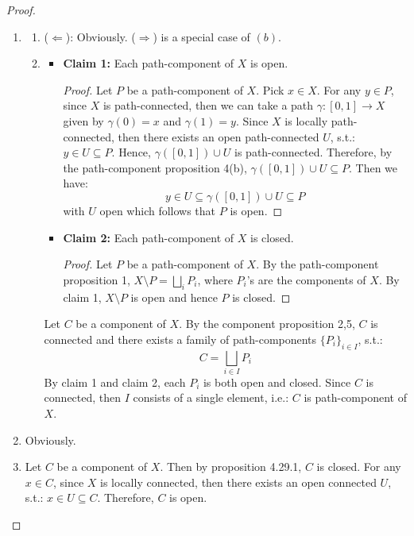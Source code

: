 \begin{proof}
    \begin{enumerate}
        \item \begin{enumerate}
            \item ($\Leftarrow$): Obviously. ($\Rightarrow$) is a special case of $(b)$.
            \item \begin{itemize}
                \item \textbf{Claim 1:} Each path-component of $X$ is open.
                \begin{proof}
                    Let $P$ be a path-component of $X$. Pick $x \in X$. For any $y \in P$, since $X$ is path-connected, then we can take a path $\gamma : [0,1] \to X$ given by $\gamma (0) = x$ and $\gamma (1) =y$. Since $X$ is locally path-connected, then there exists an open path-connected $U$, s.t.: $y \in U \subseteq P$. Hence, $\gamma ([0,1]) \cup U$ is path-connected. Therefore, by the path-component proposition 4(b), $\gamma ([0,1]) \cup U \subseteq P$. Then we have:
                    $$y \in U \subseteq \gamma ([0,1]) \cup U \subseteq P$$
                    with $U$ open which follows that $P$ is open.
                \end{proof}
                \item \textbf{Claim 2:} Each path-component of $X$ is closed.
                \begin{proof}
                    Let $P$ be a path-component of $X$. By the path-component proposition 1, $X \setminus P = \bigsqcup_i P_i$, where $P_i$'s are the components of $X$. By claim 1, $X \setminus P$ is open and hence $P$ is closed.
                \end{proof}
            \end{itemize}
            Let $C$ be a component of $X$. By the component proposition 2,5, $C$ is connected and there exists a family of path-components $\{P_i \}_{i\in I}$, s.t.:
            $$C= \bigsqcup_{i \in I} P_i$$
            By claim 1 and claim 2, each $P_i$ is both open and closed. Since $C$ is connected, then $I$ consists of a single element, i.e.: $C$ is path-component of $X$.
        \end{enumerate}
        \item Obviously.
        \item Let $C$ be a component of $X$. Then by proposition 4.29.1, $C$ is closed. For any $x \in C$, since $X$ is locally connected, then there exists an open connected $U$, s.t.: $x \in U \subseteq C$. Therefore, $C$ is open.
    \end{enumerate}
\end{proof}

